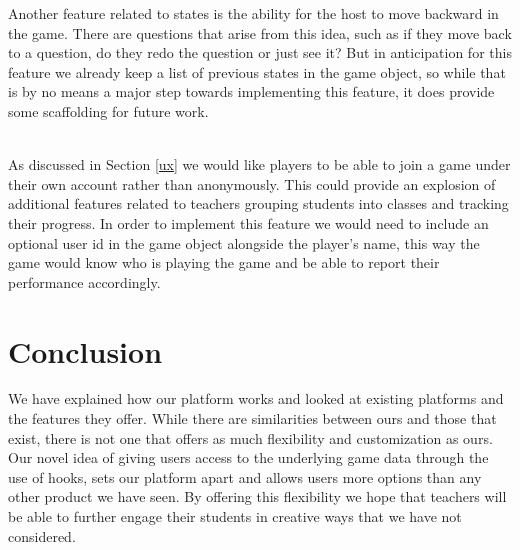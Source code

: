 \documentclass{article}
\begin{document}
    Another feature related to states is the ability for the host to move backward in the game. There are questions that arise from this idea, such as if they move back to a question, do they redo the question or just see it? But in anticipation for this feature we already keep a list of previous states in the game object, so while that is by no means a major step towards implementing this feature, it does provide some scaffolding for future work.
    \\\\
    \smallskip
    
    As discussed in Section \ref{ux} we would like players to be able to join a game under their own account rather than anonymously. This could provide an explosion of additional features related to teachers grouping students into classes and tracking their progress. In order to implement this feature we would need to include an optional user id in the game object alongside the player's name, this way the game would know who is playing the game and be able to report their performance accordingly.
    
\section{Conclusion}
    We have explained how our platform works and looked at existing platforms and the features they offer. While there are similarities between ours and those that exist, there is not one that offers as much flexibility and customization as ours. Our novel idea of giving users access to the underlying game data through the use of hooks, sets our platform apart and allows users more options than any other product we have seen. By offering this flexibility we hope that teachers will be able to further engage their students in creative ways that we have not considered. 

\printbibliography[title={Bibliography}]
\end{document}
